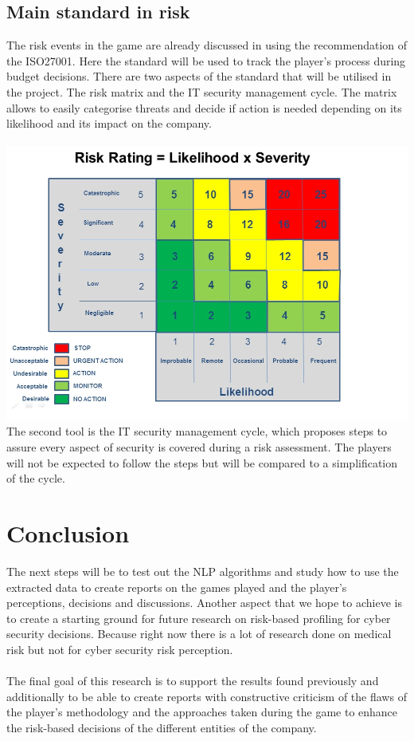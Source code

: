 \documentclass[12pt,journal,compsoc]{IEEEtran}
\begin{document}
\subsection{Main standard in risk }
The risk events in the game are already discussed in \cite{DnD} using the recommendation of the ISO27001. Here the standard will be used to track the player's process during budget decisions. 
There are two aspects of the standard that will be utilised in the project. The risk matrix and the IT security management cycle.
The matrix allows to easily categorise threats and decide if action is needed depending on its likelihood and its impact on the company.
\\\\
\includegraphics[scale=0.35]{risk-matrix.png}
The second tool is the IT security management cycle, which proposes steps to assure every aspect of security is covered during a risk assessment. The players will not be expected to follow the steps but will be compared to a simplification of the cycle.\cite{cycle}
\section{Conclusion}
The next steps will be to test out the NLP algorithms and study how to use the extracted data to create reports on the games played and the player's perceptions, decisions and discussions. Another aspect that we hope to achieve is to create a starting ground for future research on risk-based profiling for cyber security decisions. Because right now there is a lot of research done on medical risk but not for cyber security risk perception.
\\\\
The final goal of this research is to support the results found previously and additionally to be able to create reports with constructive criticism of the flaws of the player's methodology and the approaches taken during the game to enhance the risk-based decisions of the different entities of the company.
\end{document}

